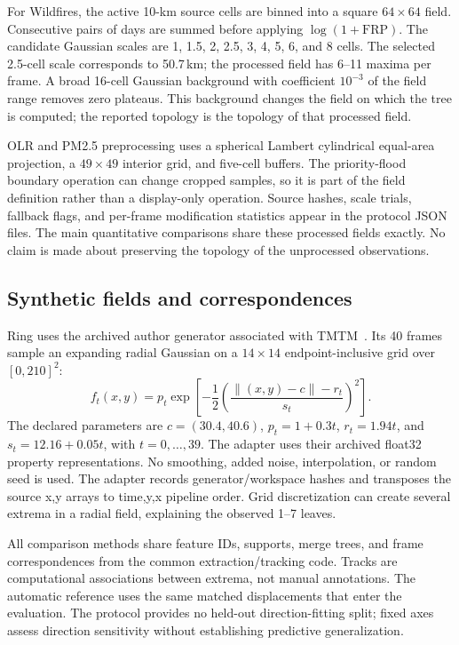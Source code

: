 For Wildfires, the active 10-km source cells are binned into a square $64\times64$ field. Consecutive pairs of days are summed before applying $\log(1+\mathrm{FRP})$. The candidate Gaussian scales are 1, 1.5, 2, 2.5, 3, 4, 5, 6, and 8 cells. The selected 2.5-cell scale corresponds to 50.7\,km; the processed field has 6--11 maxima per frame. A broad 16-cell Gaussian background with coefficient $10^{-3}$ of the field range removes zero plateaus. This background changes the field on which the tree is computed; the reported topology is the topology of that processed field.

OLR and PM2.5 preprocessing uses a spherical Lambert cylindrical equal-area projection, a $49\times49$ interior grid, and five-cell buffers. The priority-flood boundary operation can change cropped samples, so it is part of the field definition rather than a display-only operation. Source hashes, scale trials, fallback flags, and per-frame modification statistics appear in the protocol JSON files. The main quantitative comparisons share these processed fields exactly. No claim is made about preserving the topology of the unprocessed observations.

\subsection{Synthetic fields and correspondences}
Ring uses the archived author generator associated with TMTM~\cite{Koepp:2023:TMTM}. Its 40 frames sample an expanding radial Gaussian on a $14\times14$ endpoint-inclusive grid over $[0,210]^2$:
\begin{equation}f_t(x,y)=p_t\exp\!\left[-\frac12\left(\frac{\|(x,y)-c\|-r_t}{s_t}\right)^2\right].\end{equation}
The declared parameters are $c=(30.4,40.6)$, $p_t=1+0.3t$, $r_t=1.94t$, and $s_t=12.16+0.05t$, with $t=0,\dots,39$. The adapter uses their archived float32 property representations. No smoothing, added noise, interpolation, or random seed is used. The adapter records generator/workspace hashes and transposes the source x,y arrays to time,y,x pipeline order. Grid discretization can create several extrema in a radial field, explaining the observed 1--7 leaves.

All comparison methods share feature IDs, supports, merge trees, and frame correspondences from the common extraction/tracking code. Tracks are computational associations between extrema, not manual annotations. The automatic reference uses the same matched displacements that enter the evaluation. The protocol provides no held-out direction-fitting split; fixed axes assess direction sensitivity without establishing predictive generalization.

